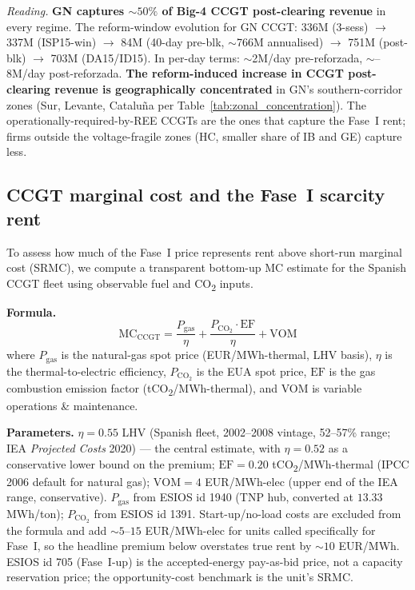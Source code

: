 \documentclass[11pt,a4paper]{article}
\begin{document}
\textit{Reading.} \textbf{GN captures $\sim 50\%$ of Big-4 CCGT post-clearing revenue} in every regime. The reform-window evolution for GN CCGT: \texteuro 336M (3-sess) $\to$ \texteuro 337M (ISP15-win) $\to$ \texteuro 84M (40-day pre-blk, $\sim$\texteuro 766M annualised) $\to$ \texteuro 751M (post-blk) $\to$ \texteuro 703M (DA15/ID15). In per-day terms: $\sim$\texteuro 2M/day pre-reforzada, $\sim$--8M/day post-reforzada. \textbf{The reform-induced increase in CCGT post-clearing revenue is geographically concentrated} in GN's southern-corridor zones (Sur, Levante, Cataluña per Table~\ref{tab:zonal_concentration}). The operationally-required-by-REE CCGTs are the ones that capture the Fase~I rent; firms outside the voltage-fragile zones (HC, smaller share of IB and GE) capture less.

\subsection{CCGT marginal cost and the Fase~I scarcity rent}\label{sec:prov:phf_minus_pdbf:mc}

To assess how much of the Fase~I price represents rent above short-run marginal cost (SRMC), we compute a transparent bottom-up MC estimate for the Spanish CCGT fleet using observable fuel and CO\textsubscript{2} inputs.

\textbf{Formula.}
\[
\mathrm{MC}_{\text{CCGT}} = \frac{P_{\text{gas}}}{\eta} + \frac{P_{\text{CO}_2} \cdot \mathrm{EF}}{\eta} + \mathrm{VOM}
\]
where $P_{\text{gas}}$ is the natural-gas spot price (EUR/MWh-thermal, LHV basis), $\eta$ is the thermal-to-electric efficiency, $P_{\text{CO}_2}$ is the EUA spot price, $\mathrm{EF}$ is the gas combustion emission factor (tCO\textsubscript{2}/MWh-thermal), and VOM is variable operations \& maintenance.

\textbf{Parameters.} $\eta = 0.55$ LHV (Spanish fleet, 2002--2008 vintage, 52--57\% range; IEA \emph{Projected Costs} 2020) --- the central estimate, with $\eta=0.52$ as a conservative lower bound on the premium; $\mathrm{EF} = 0.20$ tCO\textsubscript{2}/MWh-thermal (IPCC 2006 default for natural gas); $\mathrm{VOM} = 4$ EUR/MWh-elec (upper end of the IEA range, conservative). $P_{\text{gas}}$ from ESIOS id 1940 (TNP hub, converted at $13.33$ MWh/ton); $P_{\text{CO}_2}$ from ESIOS id 1391. Start-up/no-load costs are excluded from the formula and add $\sim 5$--$15$ EUR/MWh-elec for units called specifically for Fase~I, so the headline premium below overstates true rent by $\sim 10$ EUR/MWh. ESIOS id 705 (Fase~I-up) is the accepted-energy pay-as-bid price, not a capacity reservation price; the opportunity-cost benchmark is the unit's SRMC.
\end{document}
